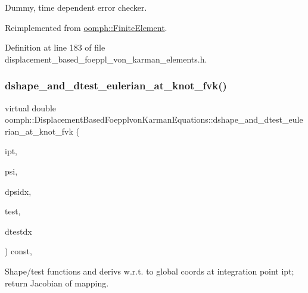 Dummy, time dependent error checker. 



Reimplemented from \hyperlink{classoomph_1_1FiniteElement_a7f67853506dc73fa6b7505108de22d1f}{oomph\+::\+Finite\+Element}.



Definition at line 183 of file displacement\+\_\+based\+\_\+foeppl\+\_\+von\+\_\+karman\+\_\+elements.\+h.

\mbox{\label{classoomph_1_1DisplacementBasedFoepplvonKarmanEquations_a93b089c7109311817e2fbd7dfcdca1f2}} 
\subsubsection{\texorpdfstring{dshape\+\_\+and\+\_\+dtest\+\_\+eulerian\+\_\+at\+\_\+knot\+\_\+fvk()}{dshape\_and\_dtest\_eulerian\_at\_knot\_fvk()}}
{\footnotesize\ttfamily virtual double oomph\+::\+Displacement\+Based\+Foepplvon\+Karman\+Equations\+::dshape\+\_\+and\+\_\+dtest\+\_\+eulerian\+\_\+at\+\_\+knot\+\_\+fvk (\begin{DoxyParamCaption}\item[{const unsigned \&}]{ipt,  }\item[{\hyperlink{classoomph_1_1Shape}{Shape} \&}]{psi,  }\item[{\hyperlink{classoomph_1_1DShape}{D\+Shape} \&}]{dpsidx,  }\item[{\hyperlink{classoomph_1_1Shape}{Shape} \&}]{test,  }\item[{\hyperlink{classoomph_1_1DShape}{D\+Shape} \&}]{dtestdx }\end{DoxyParamCaption}) const\hspace{0.3cm}{\ttfamily [protected]}, {}}



Shape/test functions and derivs w.\+r.\+t. to global coords at integration point ipt; return Jacobian of mapping. 



